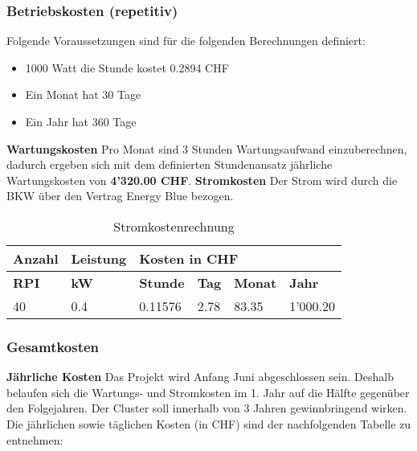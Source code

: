 \subsubsection{Betriebskosten (repetitiv)}

Folgende Voraussetzungen sind für die folgenden Berechnungen definiert:
\begin{itemize}
	\item 1000 Watt die Stunde kostet 0.2894 CHF
	\item Ein Monat hat 30 Tage
	\item Ein Jahr hat 360 Tage
\end{itemize}

\textbf{Wartungskosten}
\newline
Pro Monat sind 3 Stunden Wartungsaufwand einzuberechnen, dadurch ergeben sich mit dem definierten Stundenansatz jährliche Wartungskosten von \textbf{4'320.00 CHF}. \newline
\newline
\textbf{Stromkosten}\newline
Der Strom wird durch die BKW über den Vertrag Energy Blue bezogen.

\begin{table}[H]
\centering
\begin{tabular}{p{1.5cm}p{2cm}|p{2.75cm}p{2.75cm}p{2.75cm}p{2.75cm}}
\hline
\rowcolor{heading} \textbf{Anzahl} & \textbf{Leistung} & \multicolumn{4}{l}{\textbf{Kosten in CHF}} \\\hline
\rowcolor{subheading} \textbf{RPI} & \textbf{kW} & \textbf{Stunde} &\textbf{Tag} & \textbf{Monat} &\textbf{Jahr} \\\hline
40 & 0.4 & 0.11576 & 2.78 & 83.35 & 1'000.20 \\\hline
\end{tabular}
\caption{Stromkostenrechnung}
\end{table}

\subsubsection{Gesamtkosten}

\textbf{Jährliche Kosten} \newline
Das Projekt wird Anfang Juni abgeschlossen sein. Deshalb belaufen sich die Wartungs- und Stromkosten im 1. Jahr auf die Hälfte gegenüber den Folgejahren.
Der Cluster soll innerhalb von 3 Jahren gewinnbringend wirken. Die jährlichen sowie täglichen Kosten (in CHF) sind der nachfolgenden Tabelle zu entnehmen: 

